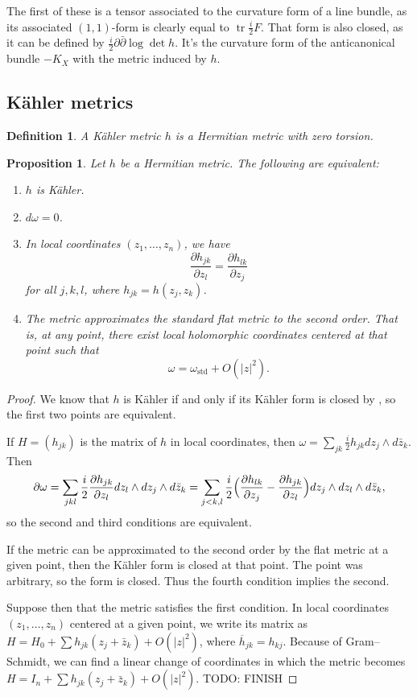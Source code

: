 \documentclass[10pt,a4paper]{article}
\newtheorem{prop}[theo]{Proposition}
\newtheorem{defi}[theo]{Definition}
\newtheorem*{proof}{Proof}
\DeclareMathOperator{\tr}{tr}
\begin{document}
The first of these is a tensor associated to the curvature form of a line bundle, as its associated $(1,1)$-form is clearly equal to $\tr \frac i2 F$. That form is also closed, as it can be defined by $\frac i2 \partial\bar\partial \log \det h$. It's the curvature form of the anticanonical bundle $-K_X$ with the metric induced by $h$.




\subsection{K\"ahler metrics}

\begin{defi}
A \emph{K\"ahler metric} $h$ is a Hermitian metric with zero torsion.
\end{defi}


\begin{prop}
Let $h$ be a Hermitian metric. The following are equivalent:
\begin{enumerate}
\item $h$ is K\"ahler.
\item $d\omega = 0$.
\item In local coordinates $(z_1,\ldots,z_n)$, we have
\[
\frac{\partial h_{jk}}{\partial z_l}
= \frac{\partial h_{lk}}{\partial z_j}
\]
for all $j,k,l$, where $h_{jk} = h(z_j,z_k)$.
\item The metric approximates the standard flat metric to the second order. That is, at any point, there exist local holomorphic coordinates centered at that point such that
\[
\omega = \omega_{\text{std}} + O(|z|^2).
\]
\end{enumerate}
\end{prop}

\begin{proof}
We know that $h$ is K\"ahler if and only if its K\"ahler form is closed by , so the first two points are equivalent.

If $H = (h_{jk})$ is the matrix of $h$ in local coordinates, then $\omega = \sum_{jk} \frac i2 h_{jk} dz_j \wedge d\bar z_k$. Then
\[
\partial\omega
= \sum_{jkl} \frac i2 \frac{\partial h_{jk}}{\partial z_l} dz_l \wedge dz_j \wedge d\bar z_k
= \sum_{j<k,l} \frac i2
\Bigl(
\frac{\partial h_{lk}}{\partial z_j}
- \frac{\partial h_{jk}}{\partial z_l}
\Bigr)
dz_j \wedge dz_l \wedge d\bar z_k,
\]
so the second and third conditions are equivalent.

If the metric can be approximated to the second order by the flat metric at a given point, then the K\"ahler form is closed at that point. The point was arbitrary, so the form is closed. Thus the fourth condition implies the second.

Suppose then that the metric satisfies the first condition. In local coordinates $(z_1,\ldots,z_n)$ centered at a given point, we write its matrix as $H = H_0 + \sum h_{jk}(z_j + \bar z_k) + O(|z|^2)$, where $\overline h_{jk} = h_{kj}$. Because of Gram--Schmidt, we can find a linear change of coordinates in which the metric becomes $H = I_n + \sum h_{jk}(z_j + \bar z_k) + O(|z|^2)$.
TODO: FINISH
\end{proof}
\end{document}

